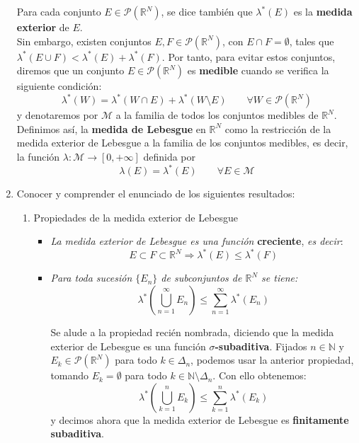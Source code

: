 \documentclass[a4paper, 12pt]{article}
\begin{document}
\begin{enumerate}[label=\textbf{\arabic*}.]
Para cada conjunto \(E \in \mathcal{P} ( \mathbb{R}^N)\), se dice también que \(\lambda^* (E)\) es la \textbf{medida exterior} de \(E\). \\

Sin embargo, existen conjuntos \(E, F \in \mathcal{P} ( \mathbb{R}^N ) \), con \(E \cap F = \emptyset\), tales que \(\lambda^* (E \cup F) < \lambda^* (E) + \lambda^* (F)\). Por tanto, para evitar estos conjuntos, diremos que un conjunto \(E \in \mathcal{P} (\mathbb{R}^N)\) es \textbf{medible} cuando se verifica la siguiente condición:
\begin{equation}\label{medible}
 \lambda^* (W) = \lambda^* (W \cap E) + \lambda^* (W \setminus E) \qquad \forall W \in \mathcal{P} (\mathbb{R}^N)
\end{equation}
y denotaremos por \(\mathcal{M}\) a la familia de todos los conjuntos medibles de \(\mathbb{R}^N\). \\

Definimos así, la \textbf{medida de Lebesgue} en \(\mathbb{R}^N\) como la restricción de la medida exterior de Lebesgue a la familia de los conjuntos medibles, es decir, la función \(\lambda: \mathcal{M} \to [0, + \infty]\) definida por
\begin{equation}\label{medida_lebesgue}
 \lambda (E) = \lambda^* (E) \qquad \forall E \in \mathcal{M}
\end{equation}

\item Conocer y comprender el enunciado de los siguientes resultados:
\begin{enumerate}[label=\textit{\alph*})]
	\item Propiedades de la medida exterior de Lebesgue
	
\begin{itemize}
	\item \textit{La medida exterior de Lebesgue es una función} \textbf{creciente}, \textit{es decir}:
	\[
		E \subset F \subset \mathbb{R}^N \Longrightarrow \lambda^* (E) \leq \lambda^* (F)
	\]
	
	\item \textit{Para toda sucesión \(\{E_n\}\) de subconjuntos de \(\mathbb{R}^N\) se tiene:}
	\[
		\lambda^* \left( \bigcup_{n=1}^{\infty} E_n \right) \leq \sum_{n=1}^{\infty} \lambda^* (E_n)
	\]
	
	Se alude a la propiedad recién nombrada, diciendo que la medida exterior de Lebesgue es una función \(\sigma\)\textbf{-subaditiva}. Fijados \(n \in \mathbb{N}\) y \(E_k \in \mathcal{P} (\mathbb{R}^N)\) para todo \(k \in \Delta_n\), podemos usar la anterior propiedad, tomando \(E_k = \emptyset\) para todo \(k \in \mathbb{N} \setminus \Delta_n\). Con ello obtenemos:
	\[
		\lambda^* \left( \bigcup_{k=1}^{n} E_k \right) \leq \sum_{k=1}^{n} \lambda^* (E_k)
	\]
y decimos ahora que la medida exterior de Lebesgue es \textbf{finitamente subaditiva}.
\end{itemize}


\end{enumerate}
\end{enumerate}
\end{document}
